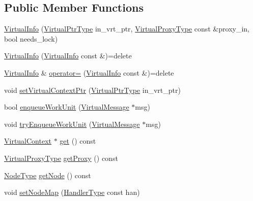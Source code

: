 \subsection*{Public Member Functions}
\begin{DoxyCompactItemize}
\item 
\hyperlink{structvt_1_1vrt_1_1_virtual_info_a8c6544976bd8778afc357ee3e14b0e07}{Virtual\+Info} (\hyperlink{structvt_1_1vrt_1_1_virtual_info_aede28e76785423dd2685fe4cf54afa21}{Virtual\+Ptr\+Type} in\+\_\+vrt\+\_\+ptr, \hyperlink{namespacevt_a1b417dd5d684f045bb58a0ede70045ac}{Virtual\+Proxy\+Type} const \&proxy\+\_\+in, bool needs\+\_\+lock)
\item 
\hyperlink{structvt_1_1vrt_1_1_virtual_info_a783d8ff575a96a42e5f1275e0b4ea1c8}{Virtual\+Info} (\hyperlink{structvt_1_1vrt_1_1_virtual_info}{Virtual\+Info} const \&)=delete
\item 
\hyperlink{structvt_1_1vrt_1_1_virtual_info}{Virtual\+Info} \& \hyperlink{structvt_1_1vrt_1_1_virtual_info_a63b12c1dfcbc3c6d34be9100c704dd81}{operator=} (\hyperlink{structvt_1_1vrt_1_1_virtual_info}{Virtual\+Info} const \&)=delete
\item 
void \hyperlink{structvt_1_1vrt_1_1_virtual_info_ab36ad072148fb10cb3c2c441488bf73d}{set\+Virtual\+Context\+Ptr} (\hyperlink{structvt_1_1vrt_1_1_virtual_info_aede28e76785423dd2685fe4cf54afa21}{Virtual\+Ptr\+Type} in\+\_\+vrt\+\_\+ptr)
\item 
bool \hyperlink{structvt_1_1vrt_1_1_virtual_info_a9e31b6696cfa2482c036f70bf7ae6285}{enqueue\+Work\+Unit} (\hyperlink{structvt_1_1vrt_1_1_virtual_message}{Virtual\+Message} $\ast$msg)
\item 
void \hyperlink{structvt_1_1vrt_1_1_virtual_info_a58cd2e2f56595ccf7ca2643fee1c8d87}{try\+Enqueue\+Work\+Unit} (\hyperlink{structvt_1_1vrt_1_1_virtual_message}{Virtual\+Message} $\ast$msg)
\item 
\hyperlink{structvt_1_1vrt_1_1_virtual_context}{Virtual\+Context} $\ast$ \hyperlink{structvt_1_1vrt_1_1_virtual_info_a7857993ff78f907fd2d95d5637cc9a87}{get} () const
\item 
\hyperlink{namespacevt_a1b417dd5d684f045bb58a0ede70045ac}{Virtual\+Proxy\+Type} \hyperlink{structvt_1_1vrt_1_1_virtual_info_aeba89cdb61c7723a35f1839479c0126f}{get\+Proxy} () const
\item 
\hyperlink{namespacevt_a866da9d0efc19c0a1ce79e9e492f47e2}{Node\+Type} \hyperlink{structvt_1_1vrt_1_1_virtual_info_aac6a0d894c563a3c347930e872541e1b}{get\+Node} () const
\item 
void \hyperlink{structvt_1_1vrt_1_1_virtual_info_acb0b673b07b17b8eb83a91168e6c5658}{set\+Node\+Map} (\hyperlink{namespacevt_af64846b57dfcaf104da3ef6967917573}{Handler\+Type} const han)

\end{DoxyCompactItemize}
